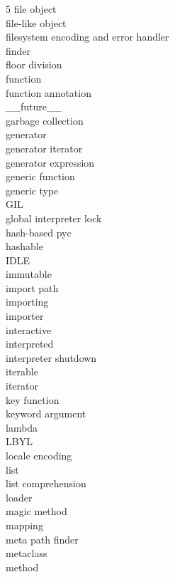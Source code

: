 \documentclass [8pt] {extarticle}
\begin{document}
\begin {multicols} {5}
        file object \\
        file-like object \\
        filesystem encoding and error handler \\
        finder \\
        floor division \\
        function \\
        function annotation \\
        \_\_future\_\_ \\
        garbage collection \\
        generator \\
        generator iterator \\
        generator expression \\
        generic function \\
        generic type \\
        GIL \\
        global interpreter lock \\
        hash-based pyc \\
        hashable \\
        IDLE \\
        immutable \\
        import path \\
        importing \\
        importer \\
        interactive \\
        interpreted \\
        interpreter shutdown \\
        iterable \\
        iterator \\
        key function \\
        keyword argument \\
        lambda \\
        LBYL \\
        locale encoding \\
        list \\
        list comprehension \\
        loader \\
        magic method \\
        mapping \\
        meta path finder \\
        metaclass \\
        method \\

\end{multicols}
\end{document}
